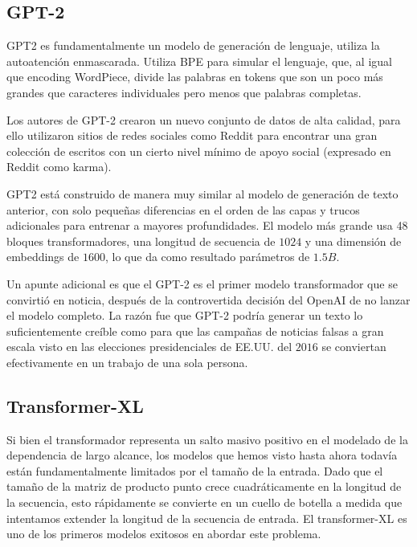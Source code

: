 \documentclass[conference]{IEEEtran}
\begin{document}
\subsection{GPT-2}

GPT2 es fundamentalmente un modelo de generaci\'on de lenguaje, utiliza la autoatenci\'on enmascarada. Utiliza BPE para simular el lenguaje, que, al igual que encoding WordPiece, divide las palabras en tokens que son un poco m\'as grandes que caracteres individuales pero menos que palabras completas.

Los autores de GPT-2 crearon un nuevo conjunto de datos de alta calidad, para ello utilizaron sitios de redes sociales como Reddit para encontrar una gran colecci\'on de escritos con un cierto nivel m\'inimo de apoyo social (expresado en Reddit como karma).

\vspace{0.2cm}


GPT2 est\'a construido de manera muy similar al modelo de generaci\'on de texto anterior, con solo peque\~nas diferencias en el orden de las capas y trucos adicionales para entrenar a mayores profundidades. El modelo m\'as grande usa 48 bloques transformadores, una longitud de secuencia de $1024$ y una dimensi\'on de embeddings de $1600$, lo que da como resultado par\'ametros de $1.5B$.


Un apunte adicional es que el GPT-2 es el primer modelo  transformador que  se convirti\'o en noticia, después de la controvertida decisi\'on del OpenAI de no lanzar el modelo completo. La raz\'on fue que GPT-2 podr\'ia generar un texto lo suficientemente cre\'ible como para que las campa\~nas de noticias falsas a gran escala visto en las elecciones presidenciales de EE.UU. del  $2016$ se conviertan efectivamente en un trabajo de una sola persona.

\subsection{Transformer-XL}


Si bien el transformador representa un salto masivo positivo  en el modelado de la dependencia de largo alcance, los modelos que hemos visto hasta ahora todav\'ia est\'an fundamentalmente limitados por el tama\~no de la entrada. Dado que el tama\~no de la matriz de producto punto crece cuadr\'aticamente en la longitud de la secuencia, esto r\'apidamente se convierte en un cuello de botella a medida que intentamos extender la longitud de la secuencia de entrada. El  transformer-XL es uno de los primeros modelos exitosos en abordar este problema.
\end{document}
